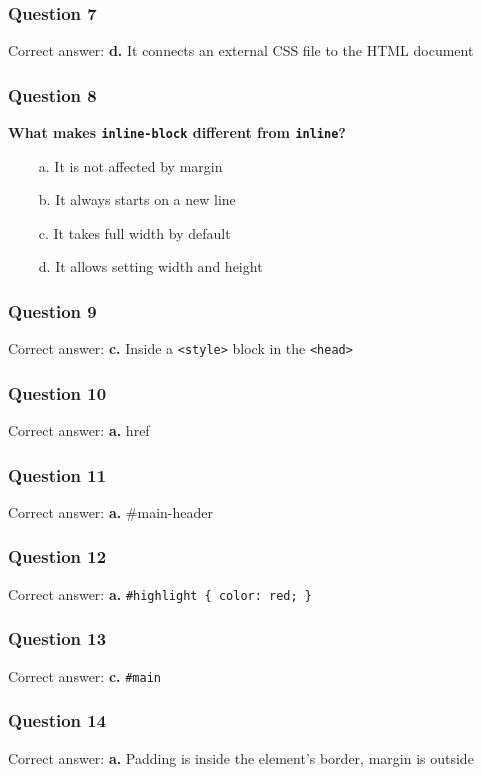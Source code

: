 \documentclass{article}
\newcommand{\cmark}{\textcolor{green}{\ding{51}}} %
\newcommand{\xmark}{\textcolor{red}{\ding{55}}}   %
\begin{document}
\subsubsection*{Question 7}
Correct answer: \textbf{d.} It connects an external CSS file to the HTML document

\subsubsection*{Question 8}
\textbf{What makes \texttt{inline-block} different from \texttt{inline}?}
\begin{itemize}
  \item[\xmark\ a.] It is not affected by margin
  \item[\xmark\ b.] It always starts on a new line
  \item[\xmark\ c.] It takes full width by default
  \item[\cmark\ d.] It allows setting width and height
\end{itemize}

\subsubsection*{Question 9}
Correct answer: \textbf{c.} Inside a \texttt{<style>} block in the \texttt{<head>}

\subsubsection*{Question 10}
Correct answer: \textbf{a.} href

\subsubsection*{Question 11}
Correct answer: \textbf{a.} \#main-header

\subsubsection*{Question 12}
Correct answer: \textbf{a.} \texttt{\#highlight \{ color: red; \}}

\subsubsection*{Question 13}
Correct answer: \textbf{c.} \texttt{\#main}

\subsubsection*{Question 14}
Correct answer: \textbf{a.} Padding is inside the element's border, margin is outside
\end{document}

